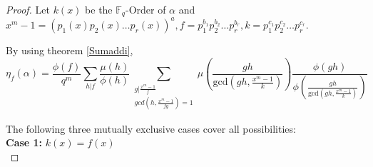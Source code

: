 \documentclass[12pt,a4paper]{article}
\theoremstyle{plain}
\theoremstyle{definition}
\numberwithin{equation}{section}
\begin{document}
     \begin{proof}
        Let $k(x)$ be the $\mathbb{F}_q$-Order of $\alpha$ and $x^m-1=(p_1(x)p_2(x)\dots p_r(x))^a, f=p_1^{b_1} p_2^{b_2}\dots p_r^{b_r}, k=p_1^{c_1} p_2^{c_2}\dots p_r^{c_r}$. 

        By using theorem \ref{Sumaddi}, 
        \begin{equation}\label{EQThm}
            \eta_f(\alpha) = \displaystyle \frac{\phi(f)}{q^m}\sum_{h\vert f} \frac{\mu(h)}{\phi(h)} \sum_{\substack{g \vert \frac{x^m-1}{f}\\ gcd(h,\frac{x^m-1}{fg}) =1} } \mu \left( \frac{gh}{\text{gcd}(gh,\frac{x^m-1}{k})}\right)\frac{\phi(gh)}{\phi\left( \frac{gh}{\text{gcd}(gh,\frac{x^m-1}{k})}\right)}
        \end{equation}
         
        The following three mutually exclusive cases cover all possibilities:\\
         \textbf{Case 1:} $k(x)=f(x)$\\
         

\end{proof}
\end{document}
